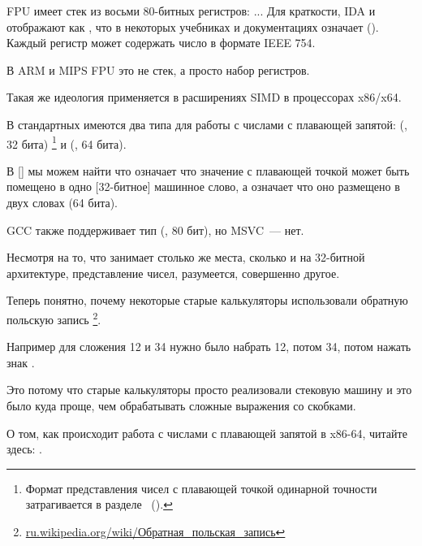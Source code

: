 \label{FPU_is_stack}
FPU имеет стек из восьми 80-битных регистров: ...
Для краткости, IDA и \olly отображают  как ,
что в некоторых учебниках и документациях означает  ().
Каждый регистр может содержать число в формате IEEE 754\FNURLIEEE.


В ARM и MIPS FPU это не стек, а просто набор регистров.

Такая же идеология применяется в расширениях SIMD в процессорах x86/x64.

\sectionold{\CCpp}

В стандартных \CCpp имеются два типа для работы с числами с плавающей запятой: 
\Tfloat (\FNURLSP, 32 бита)
\footnote{Формат представления чисел с плавающей точкой одинарной точности затрагивается в разделе 
\IT{\WorkingWithFloatAsWithStructSubSubSectionName}~().}
и \Tdouble (\FNURLDP, 64 бита).

В [] мы можем найти что  означает что значение с плавающей точкой может быть
помещено в одно [32-битное] машинное слово, а  означает что оно размещено в двух словах (64 бита).

GCC также поддерживает тип  (\FNURLEP, 80 бит), но MSVC~--- нет.

Несмотря на то, что \Tfloat занимает столько же места, сколько и \Tint на 32-битной архитектуре, 
представление чисел, разумеется, совершенно другое.






Теперь понятно, почему некоторые старые калькуляторы использовали обратную польскую запись
\footnote{\href{http://go.yurichev.com/17355}{ru.wikipedia.org/wiki/Обратная\_польская\_запись}}.

Например для сложения 12 и 34 нужно было набрать 12, потом 34, потом нажать знак .

Это потому что старые калькуляторы просто реализовали стековую машину и это было куда проще, чем обрабатывать сложные выражения со скобками.


О том, как происходит работа с числами с плавающей запятой в x86-64, читайте здесь: .



